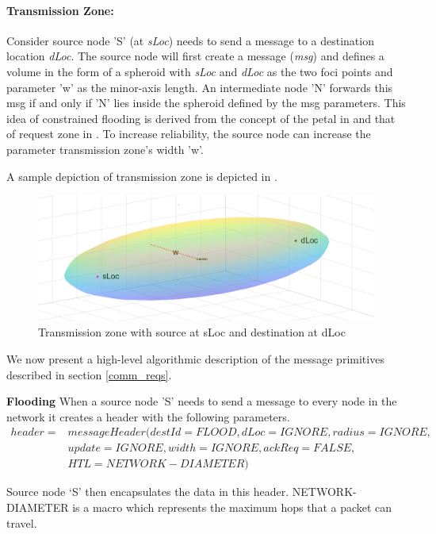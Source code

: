 \paragraph{Transmission Zone:} Consider source node 'S' (at \emph{sLoc}) needs to send a message to a destination location \emph{dLoc}. The source node will first create a message (\emph{msg}) and defines a volume in the form of a spheroid with \emph{sLoc} and \emph{dLoc} as the two foci points and parameter 'w' as the minor-axis length. An intermediate node 'N' forwards this msg if and only if 'N' lies inside the spheroid defined by the msg parameters. This idea of constrained flooding is derived from the concept of the petal in \cite{6133499} and that of request zone in \cite{Ko:1998:LRM:288235.288252}. To increase reliability, the source node can increase the parameter transmission zone's width 'w'.

A sample depiction of transmission zone is depicted in .

\begin{figure}[hbtp]
\centering
\includegraphics[width=1\textwidth]{Chapter-3/figs/Spheroid}
\caption{Transmission zone with source at sLoc and destination at dLoc}
\label{fig:spheroid}
\end{figure}

We now present a high-level algorithmic description of the message primitives described in section \ref{comm_reqs}.

\textbf{Flooding}
When a source node 'S' needs to send a message to every node in the network it creates a header with the following parameters.
\begin{eqnarray*}
header = & messageHeader(destId = FLOOD, dLoc = IGNORE, radius = IGNORE,\\
    & update = IGNORE, width = IGNORE, ackReq = FALSE, \\
    & HTL = NETWORK-DIAMETER)
\end{eqnarray*} 

Source node `S' then encapsulates the data in this header. NETWORK-DIAMETER is a macro which represents the maximum hops that a packet can travel. 

